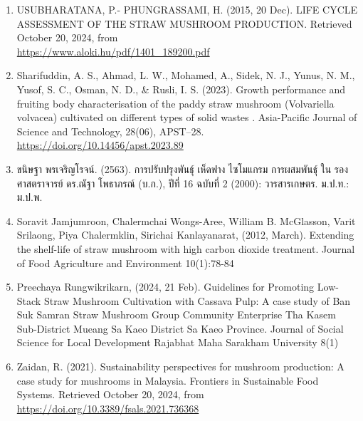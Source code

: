 \begin{enumerate}
  \item USUBHARATANA, P.- PHUNGRASSAMI, H. (2015, 20 Dec). LIFE CYCLE ASSESSMENT OF THE STRAW MUSHROOM PRODUCTION. Retrieved October 20, 2024, from \href{https://www.aloki.hu/pdf/1401_189200.pdf}{\\ https://www.aloki.hu/pdf/1401\_189200.pdf}
  \item Sharifuddin, A. S., Ahmad, L. W., Mohamed, A., Sidek, N. J., Yunus, N. M., Yusof, S. C., Osman, N. D., & Rusli, I. S. (2023). Growth performance and fruiting body characterisation of the paddy straw mushroom (Volvariella volvacea) cultivated on different types of solid wastes . Asia-Pacific Journal of Science and Technology, 28(06), APST–28. \href{https://doi.org/10.14456/apst.2023.89}{https://doi.org/10.14456/apst.2023.89}
  \item {\T ขนิษฐา พรเจริญโรจน์}. (2563). {\T การปรับปรุงพันธุ์ เห็ดฟาง ไซโมแกรม การผสมพันธุ์  ใน รองศาสตราจารย์ ดร.ณัฐา โพธาภรณ์ (บ.ก.), ปีที่} 16 {\T ฉบับที่} 2 (2000): {\T วารสารเกษตร. ม.ป.ท.: ม.ป.พ.}
  \item Soravit Jamjumroon, Chalermchai Wongs-Aree, William B. McGlasson, Varit Srilaong, Piya Chalermklin, Sirichai Kanlayanarat, (2012, March). Extending the shelf-life of straw mushroom with high carbon dioxide treatment. Journal of Food Agriculture and Environment 10(1):78-84
  \item Preechaya Rungwikrikarn, (2024, 21 Feb). Guidelines for Promoting Low-Stack Straw Mushroom Cultivation with Cassava Pulp: A case study of Ban Suk Samran Straw Mushroom Group Community Enterprise Tha Kasem Sub-District Mueang Sa Kaeo District Sa Kaeo Province. Journal of Social Science for Local Development Rajabhat Maha Sarakham University 8(1)
  \item Zaidan, R. (2021). Sustainability perspectives for mushroom production: A case study for mushrooms in Malaysia. Frontiers in Sustainable Food Systems. Retrieved October 20, 2024, from \href{https://doi.org/10.3389/fsals.2021.736368}{https://doi.org/10.3389/fsals.2021.736368}
\end{enumerate}
